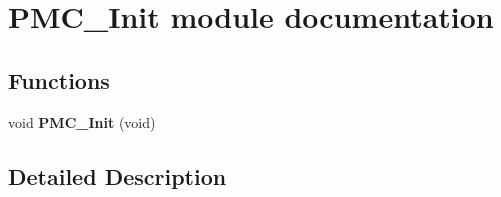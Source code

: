 \hypertarget{group___p_m_c___init__module}{}\section{P\+M\+C\+\_\+\+Init module documentation}
\label{group___p_m_c___init__module}
\subsection*{Functions}
\begin{DoxyCompactItemize}
\item 
void {\bfseries P\+M\+C\+\_\+\+Init} (void)\hypertarget{group___p_m_c___init__module_ga6eb7f9b3eba1a3e145f34fae397502e6}{}\label{group___p_m_c___init__module_ga6eb7f9b3eba1a3e145f34fae397502e6}

\end{DoxyCompactItemize}


\subsection{Detailed Description}
